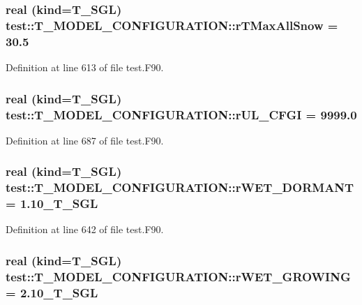 \hypertarget{typetest_1_1_t___m_o_d_e_l___c_o_n_f_i_g_u_r_a_t_i_o_n_a991e214068dc969196b4cd5bd51f29b4}{
\subsubsection[{rTMaxAllSnow}]{\setlength{\rightskip}{0pt plus 5cm}real (kind={\bf T\_\-SGL}) {\bf test::T\_\-MODEL\_\-CONFIGURATION::rTMaxAllSnow} = 30.5}}
\label{typetest_1_1_t___m_o_d_e_l___c_o_n_f_i_g_u_r_a_t_i_o_n_a991e214068dc969196b4cd5bd51f29b4}


Definition at line 613 of file test.F90.

\hypertarget{typetest_1_1_t___m_o_d_e_l___c_o_n_f_i_g_u_r_a_t_i_o_n_a6b381e0936d42bac6388ac9a29b44e3c}{
\subsubsection[{rUL\_\-CFGI}]{\setlength{\rightskip}{0pt plus 5cm}real (kind={\bf T\_\-SGL}) {\bf test::T\_\-MODEL\_\-CONFIGURATION::rUL\_\-CFGI} = 9999.0}}
\label{typetest_1_1_t___m_o_d_e_l___c_o_n_f_i_g_u_r_a_t_i_o_n_a6b381e0936d42bac6388ac9a29b44e3c}


Definition at line 687 of file test.F90.

\hypertarget{typetest_1_1_t___m_o_d_e_l___c_o_n_f_i_g_u_r_a_t_i_o_n_a1ebaa1191f2dfacff696caed3a4178a8}{
\subsubsection[{rWET\_\-DORMANT}]{\setlength{\rightskip}{0pt plus 5cm}real (kind={\bf T\_\-SGL}) {\bf test::T\_\-MODEL\_\-CONFIGURATION::rWET\_\-DORMANT} = 1.10\_\-T\_\-SGL}}
\label{typetest_1_1_t___m_o_d_e_l___c_o_n_f_i_g_u_r_a_t_i_o_n_a1ebaa1191f2dfacff696caed3a4178a8}


Definition at line 642 of file test.F90.

\hypertarget{typetest_1_1_t___m_o_d_e_l___c_o_n_f_i_g_u_r_a_t_i_o_n_a6f4e954805d7d13b02946768fe22d29e}{
\subsubsection[{rWET\_\-GROWING}]{\setlength{\rightskip}{0pt plus 5cm}real (kind={\bf T\_\-SGL}) {\bf test::T\_\-MODEL\_\-CONFIGURATION::rWET\_\-GROWING} = 2.10\_\-T\_\-SGL}}
\label{typetest_1_1_t___m_o_d_e_l___c_o_n_f_i_g_u_r_a_t_i_o_n_a6f4e954805d7d13b02946768fe22d29e}


